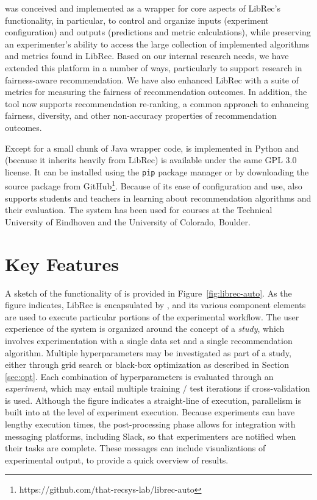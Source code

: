 \libauto{} was conceived and implemented as a wrapper for core aspects of LibRec's functionality, in particular, to control and organize inputs (experiment configuration) and outputs (predictions and metric calculations), while preserving an experimenter's ability to access the large collection of implemented algorithms and metrics found in LibRec. Based on our internal research needs, we have extended this platform in a number of ways, particularly to support research in fairness-aware recommendation. We have also enhanced LibRec with a suite of metrics for measuring the fairness of recommendation outcomes. In addition, the tool now supports recommendation re-ranking, a common approach to enhancing fairness, diversity, and other non-accuracy properties of recommendation outcomes.

Except for a small chunk of Java wrapper code, \libauto{} is implemented in Python and (because it inherits heavily from LibRec) is available under the same GPL 3.0 license. It can be installed using the \texttt{pip} package manager or by downloading the source package from GitHub\footnote{https://github.com/that-recsys-lab/librec-auto}. Because of its ease of configuration and use, \libauto{} also supports students and teachers in learning about recommendation algorithms and their evaluation. The system has been used for courses at the Technical University of Eindhoven and the University of Colorado, Boulder. 

\section{Key Features}
\label{sec:libauto_keyfeatures}

A sketch of the functionality of \libauto{} is provided in Figure~\ref{fig:librec-auto}. As the figure indicates, LibRec is encapsulated by \libauto{}, and its various component elements are used to execute particular portions of the experimental workflow. The user experience of the system is organized around the concept of a \textit{study}, which involves experimentation with a single data set and a single recommendation algorithm. Multiple hyperparameters may be investigated as part of a study, either through grid search or black-box optimization as described in Section \ref{sec:opt}. Each combination of hyperparameters is evaluated through an \textit{experiment}, which may entail multiple training / test iterations if cross-validation is used. Although the figure indicates a straight-line of execution, parallelism is built into \libauto{} at the level of experiment execution. Because experiments can have lengthy execution times, the post-processing phase allows for integration with messaging platforms, including Slack, so that experimenters are notified when their tasks are complete. These messages can include visualizations of experimental output, to provide a quick overview of results.

